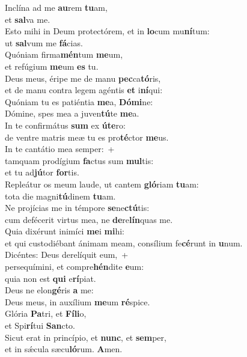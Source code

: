 \evenverse Inclína ad me \textbf{au}rem \textbf{tu}am,~\*\\
\evenverse et \textbf{sal}va me.\\
\oddverse Esto mihi in Deum protectórem, et in \textbf{lo}cum mu\textbf{ní}tum:~\*\\
\oddverse ut \textbf{sal}vum me \textbf{fá}cias.\\
\evenverse Quóniam firma\textbf{mén}tum \textbf{me}um,~\*\\
\evenverse et refúgium \textbf{me}um \textbf{es} tu.\\
\oddverse Deus meus, éripe me de manu \textbf{pec}ca\textbf{tó}ris,~\*\\
\oddverse et de manu contra legem agéntis \textbf{et} i\textbf{ní}qui:\\
\evenverse Quóniam tu es patiéntia \textbf{me}a, \textbf{Dó}\textbf{mi}ne:~\*\\
\evenverse Dómine, spes mea a juven\textbf{tú}te \textbf{me}a.\\
\oddverse In te confirmátus \textbf{sum} ex \textbf{ú}\textbf{te}ro:~\*\\
\oddverse de ventre matris meæ tu es pro\textbf{té}ctor \textbf{me}us.\\
\evenverse In te cantátio mea semper:~+\\
\evenverse  tamquam prodígium \textbf{fa}ctus sum \textbf{mul}tis:~\*\\
\evenverse et tu ad\textbf{jú}tor \textbf{for}tis.\\
\oddverse Repleátur os meum laude, ut cantem \textbf{gló}riam \textbf{tu}am:~\*\\
\oddverse tota die magni\textbf{tú}dinem \textbf{tu}am.\\
\evenverse Ne projícias me in témpore \textbf{se}ne\textbf{ctú}tis:~\*\\
\evenverse cum defécerit virtus mea, ne \textbf{de}re\textbf{lín}quas me.\\
\oddverse Quia dixérunt inimíci \textbf{me}i \textbf{mi}hi:~\*\\
\oddverse et qui custodiébant ánimam meam, consílium fe\textbf{cé}runt in \textbf{u}num.\\
\evenverse Dicéntes: Deus derelíquit eum,~+\\
\evenverse  persequímini, et compre\textbf{hén}dite \textbf{e}um:~\*\\
\evenverse quia non est \textbf{qui} e\textbf{rí}piat.\\
\oddverse Deus ne elon\textbf{gé}ris \textbf{a} me:~\*\\
\oddverse Deus meus, in auxílium \textbf{me}um \textbf{ré}spice.\\
\evenverse Glória \textbf{Pa}tri, et \textbf{Fí}\textbf{li}o,~\*\\
\evenverse et Spi\textbf{rí}tui \textbf{San}cto.\\
\oddverse Sicut erat in princípio, et \textbf{nunc}, et \textbf{sem}per,~\*\\
\oddverse et in sǽcula sæcu\textbf{ló}rum. \textbf{A}men.\\
